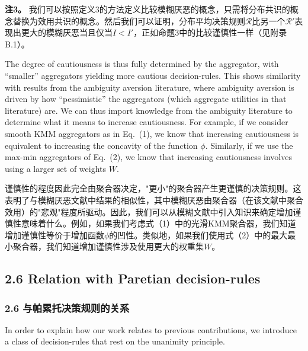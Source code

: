 \documentclass[12pt,a4paper]{article}
\newenvironment{original}
  {\par\noindent\ignorespaces}
  {\par}
\newenvironment{translation}
  {\par\noindent{\color{transblue}\ignorespaces}}
  {\par\medskip}
\begin{document}
\begin{translation}
\textbf{注3。} 我们可以按照定义3的方法定义比较模糊厌恶的概念，只需将分布共识的概念替换为效用共识的概念。然后我们可以证明，分布平均决策规则$\mathcal{R}$比另一个$\mathcal{R}'$表现出更大的模糊厌恶当且仅当$I < I'$，正如命题3中的比较谨慎性一样（见附录B.1）。
\end{translation}

\begin{original}
The degree of cautiousness is thus fully determined by the aggregator, with ``smaller'' aggregators yielding more cautious decision-rules. This shows similarity with results from the ambiguity aversion literature, where ambiguity aversion is driven by how ``pessimistic'' the aggregators (which aggregate utilities in that literature) are. We can thus import knowledge from the ambiguity literature to determine what it means to increase cautiousness. For example, if we consider smooth KMM aggregators as in Eq.\ (1), we know that increasing cautiousness is equivalent to increasing the concavity of the function $\phi$. Similarly, if we use the max-min aggregators of Eq.\ (2), we know that increasing cautiousness involves using a larger set of weights $W$.
\end{original}

\begin{translation}
谨慎性的程度因此完全由聚合器决定，"更小"的聚合器产生更谨慎的决策规则。这表明了与模糊厌恶文献中结果的相似性，其中模糊厌恶由聚合器（在该文献中聚合效用）的"悲观"程度所驱动。因此，我们可以从模糊文献中引入知识来确定增加谨慎性意味着什么。例如，如果我们考虑式（1）中的光滑KMM聚合器，我们知道增加谨慎性等价于增加函数$\phi$的凹性。类似地，如果我们使用式（2）中的最大最小聚合器，我们知道增加谨慎性涉及使用更大的权重集$W$。
\end{translation}

\subsection{2.6 Relation with Paretian decision-rules}
{\color{transblue}\subsubsection*{2.6 与帕累托决策规则的关系}}

\begin{original}
In order to explain how our work relates to previous contributions, we introduce a class of decision-rules that rest on the unanimity principle.
\end{original}
\end{document}
